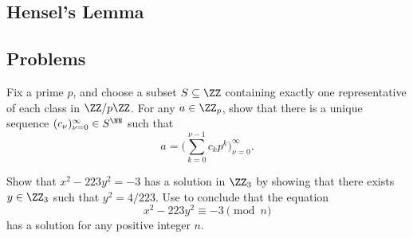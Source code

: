 \documentclass[../notes.tex]{subfiles}
\begin{document}
\todo{}

\subsection{Hensel's Lemma}


\subsection{Problems}
\begin{prob}[3 points]
	Fix a prime $p$, and choose a subset $S\subseteq\ZZ$ containing exactly one representative of each class in $\ZZ/p\ZZ$. For any $a\in\ZZ_p$, show that there is a unique sequence $(c_\nu)_{\nu=0}^\infty\in S^\NN$ such that
	\[a=\Bigg(\sum_{k=0}^{\nu-1}c_kp^k\Bigg)_{\nu=0}^\infty.\]
\end{prob}
\begin{prob}[4 points] \label{prob:223-in-z3}
	Show that $x^2-223y^2=-3$ has a solution in $\ZZ_3$ by showing that there exists $y\in\ZZ_3$ such that $y^2=4/223$. Use  to conclude that the equation
	\[x^2-223y^2\equiv-3\pmod n\]
	has a solution for any positive integer $n$.
\end{prob}




\end{document}
